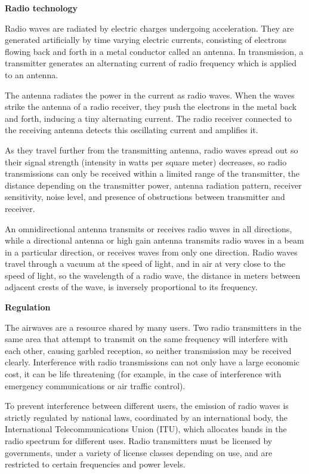 \documentclass[a4paper, twoside, 12pt]{book}
\begin{document}
\vspace{6pt}
{\noindent \textbf{Radio technology}}
\vspace{6pt}

Radio waves are radiated by electric charges undergoing acceleration. They are generated artificially by time varying electric currents, consisting of electrons flowing back and forth in a metal conductor called an antenna. In transmission, a transmitter generates an alternating current of radio frequency which is applied to an antenna.

The antenna radiates the power in the current as radio waves. When the waves strike the antenna of a radio receiver, they push the electrons in the metal back and forth, inducing a tiny alternating current. The radio receiver connected to the receiving antenna detects this oscillating current and amplifies it.

As they travel further from the transmitting antenna, radio waves spread out so their signal strength (intensity in watts per square meter) decreases, so radio transmissions can only be received within a limited range of the transmitter, the distance depending on the transmitter power, antenna radiation pattern, receiver sensitivity, noise level, and presence of obstructions between transmitter and receiver.

An omnidirectional antenna transmits or receives radio waves in all directions, while a directional antenna or high gain antenna transmits radio waves in a beam in a particular direction, or receives waves from only one direction. Radio waves travel through a vacuum at the speed of light, and in air at very close to the speed of light, so the wavelength of a radio wave, the distance in meters between adjacent crests of the wave, is inversely proportional to its frequency.

\vspace{6pt}
{\noindent \textbf{Regulation}}
\vspace{6pt}

The airwaves are a resource shared by many users. Two radio transmitters in the same area that attempt to transmit on the same frequency will interfere with each other, causing garbled reception, so neither transmission may be received clearly. Interference with radio transmissions can not only have a large economic cost, it can be life threatening (for example, in the case of interference with emergency communications or air traffic control).

To prevent interference between different users, the emission of radio waves is strictly regulated by national laws, coordinated by an international body, the International Telecommunications Union (ITU), which allocates bands in the radio spectrum for different uses. Radio transmitters must be licensed by governments, under a variety of license classes depending on use, and are restricted to certain frequencies and power levels.
\end{document}
